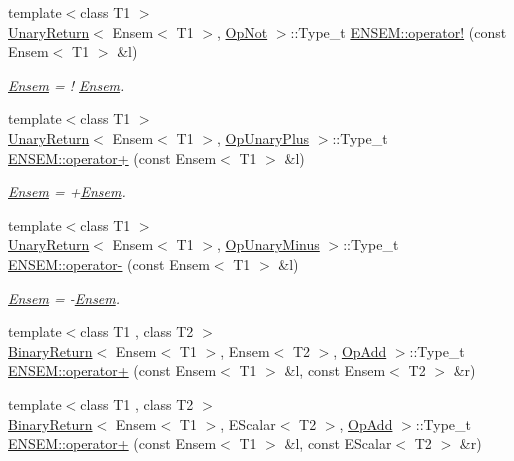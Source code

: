 \begin{DoxyCompactItemize}
{\footnotesize template$<$class T1 $>$ }\\\mbox{\hyperlink{structUnaryReturn}{Unary\+Return}}$<$ Ensem$<$ T1 $>$, \mbox{\hyperlink{structOpNot}{Op\+Not}} $>$\+::Type\+\_\+t \mbox{\hyperlink{group__eensem_gad6dafbd7d34da088e6eaf463aa56e301}{E\+N\+S\+E\+M\+::operator!}} (const Ensem$<$ T1 $>$ \&l)
\begin{DoxyCompactList}\small\item\em \mbox{\hyperlink{classENSEM_1_1Ensem}{Ensem}} = ! \mbox{\hyperlink{classENSEM_1_1Ensem}{Ensem}}. \end{DoxyCompactList}\item 
{\footnotesize template$<$class T1 $>$ }\\\mbox{\hyperlink{structUnaryReturn}{Unary\+Return}}$<$ Ensem$<$ T1 $>$, \mbox{\hyperlink{structOpUnaryPlus}{Op\+Unary\+Plus}} $>$\+::Type\+\_\+t \mbox{\hyperlink{group__eensem_ga777c950dac5bc271c641c0f086f44ebf}{E\+N\+S\+E\+M\+::operator+}} (const Ensem$<$ T1 $>$ \&l)
\begin{DoxyCompactList}\small\item\em \mbox{\hyperlink{classENSEM_1_1Ensem}{Ensem}} = +\mbox{\hyperlink{classENSEM_1_1Ensem}{Ensem}}. \end{DoxyCompactList}\item 
{\footnotesize template$<$class T1 $>$ }\\\mbox{\hyperlink{structUnaryReturn}{Unary\+Return}}$<$ Ensem$<$ T1 $>$, \mbox{\hyperlink{structOpUnaryMinus}{Op\+Unary\+Minus}} $>$\+::Type\+\_\+t \mbox{\hyperlink{group__eensem_ga401760b4a9588007075073995611fa86}{E\+N\+S\+E\+M\+::operator-\/}} (const Ensem$<$ T1 $>$ \&l)
\begin{DoxyCompactList}\small\item\em \mbox{\hyperlink{classENSEM_1_1Ensem}{Ensem}} = -\/\mbox{\hyperlink{classENSEM_1_1Ensem}{Ensem}}. \end{DoxyCompactList}\item 
{\footnotesize template$<$class T1 , class T2 $>$ }\\\mbox{\hyperlink{structBinaryReturn}{Binary\+Return}}$<$ Ensem$<$ T1 $>$, Ensem$<$ T2 $>$, \mbox{\hyperlink{structOpAdd}{Op\+Add}} $>$\+::Type\+\_\+t \mbox{\hyperlink{group__eensem_ga724a1c256d14ef567ac649b0ae8df485}{E\+N\+S\+E\+M\+::operator+}} (const Ensem$<$ T1 $>$ \&l, const Ensem$<$ T2 $>$ \&r)
\item 
{\footnotesize template$<$class T1 , class T2 $>$ }\\\mbox{\hyperlink{structBinaryReturn}{Binary\+Return}}$<$ Ensem$<$ T1 $>$, E\+Scalar$<$ T2 $>$, \mbox{\hyperlink{structOpAdd}{Op\+Add}} $>$\+::Type\+\_\+t \mbox{\hyperlink{group__eensem_ga370913e6f39a2b7be0ce0b78f156978a}{E\+N\+S\+E\+M\+::operator+}} (const Ensem$<$ T1 $>$ \&l, const E\+Scalar$<$ T2 $>$ \&r)

\end{DoxyCompactItemize}
